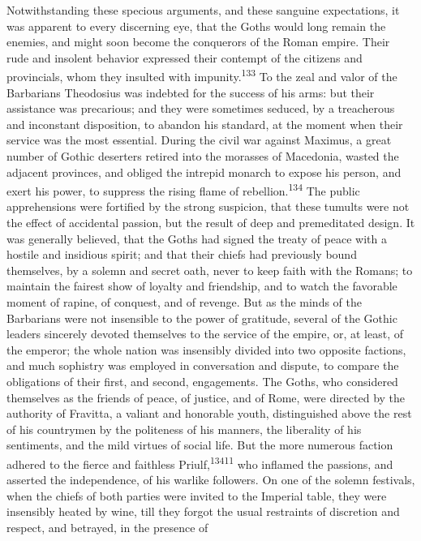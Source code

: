 Notwithstanding these specious arguments, and these sanguine
expectations, it was apparent to every discerning eye, that the
Goths would long remain the enemies, and might soon become the
conquerors of the Roman empire. Their rude and insolent behavior
expressed their contempt of the citizens and provincials, whom
they insulted with impunity.\textsuperscript{133} To the zeal and valor of the
Barbarians Theodosius was indebted for the success of his arms:
but their assistance was precarious; and they were sometimes
seduced, by a treacherous and inconstant disposition, to abandon
his standard, at the moment when their service was the most
essential. During the civil war against Maximus, a great number
of Gothic deserters retired into the morasses of Macedonia,
wasted the adjacent provinces, and obliged the intrepid monarch
to expose his person, and exert his power, to suppress the rising
flame of rebellion.\textsuperscript{134} The public apprehensions were fortified
by the strong suspicion, that these tumults were not the effect
of accidental passion, but the result of deep and premeditated
design. It was generally believed, that the Goths had signed the
treaty of peace with a hostile and insidious spirit; and that
their chiefs had previously bound themselves, by a solemn and
secret oath, never to keep faith with the Romans; to maintain the
fairest show of loyalty and friendship, and to watch the
favorable moment of rapine, of conquest, and of revenge. But as
the minds of the Barbarians were not insensible to the power of
gratitude, several of the Gothic leaders sincerely devoted
themselves to the service of the empire, or, at least, of the
emperor; the whole nation was insensibly divided into two
opposite factions, and much sophistry was employed in
conversation and dispute, to compare the obligations of their
first, and second, engagements. The Goths, who considered
themselves as the friends of peace, of justice, and of Rome, were
directed by the authority of Fravitta, a valiant and honorable
youth, distinguished above the rest of his countrymen by the
politeness of his manners, the liberality of his sentiments, and
the mild virtues of social life. But the more numerous faction
adhered to the fierce and faithless Priulf,\textsuperscript{13411} who inflamed
the passions, and asserted the independence, of his warlike
followers. On one of the solemn festivals, when the chiefs of
both parties were invited to the Imperial table, they were
insensibly heated by wine, till they forgot the usual restraints
of discretion and respect, and betrayed, in the presence of
